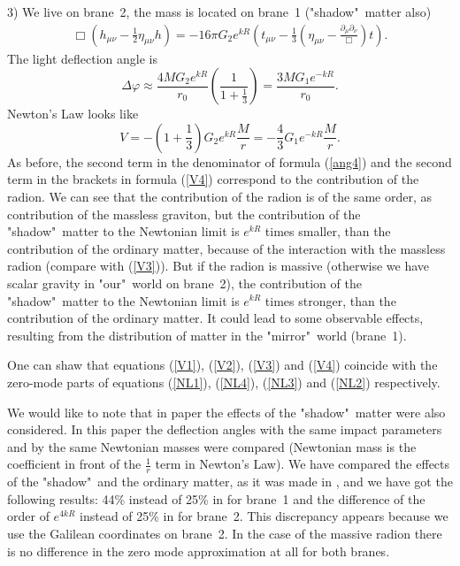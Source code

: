 \documentclass[a4paper,12pt]{article}
\begin{document}
3) We live on brane~2, the mass is located on brane~1 ("shadow"\
matter also)
\begin{eqnarray}
\Box \left(h_{\mu\nu}-\frac{1}{2}\eta_{\mu\nu}h\right)=-16\pi
G_{2}e^{kR}\left(t_{\mu\nu}-\frac{1}{3}\left(\eta_{\mu\nu}-\frac{
\partial_\mu\partial_\nu}{\Box}\right)t\right).
\end{eqnarray}
The light deflection angle is
\begin{equation}\label{ang4}
\Delta\varphi\approx\frac{4MG_{2}e^{kR}}{r_{0}}\left(\frac{1}{1+\frac{1}{3}}\right)
=\frac{3MG_{1}e^{-kR}}{r_{0}}.
\end{equation}
Newton's Law looks like
\begin{equation}\label{V4}
V=-\left(1+\frac{1}{3}\right)G_{2}e^{kR}\frac{M}{r}=-\frac{4}{3}G_{1}e^{-kR}\frac{M}{r}.
\end{equation}
As  before, the second term in the denominator of formula
(\ref{ang4}) and the second term in the brackets in formula
(\ref{V4}) correspond to the contribution of the  radion. We can
see that the contribution of the radion is of the same order, as
contribution of the massless graviton, but the contribution of the
"shadow"\ matter to  the Newtonian limit is $e^{kR}$ times
smaller, than the contribution of the ordinary matter, because of
the interaction with the massless radion (compare with
(\ref{V3})). But if the radion is massive (otherwise we have
scalar gravity in "our"\ world on brane~2), the contribution of
the "shadow"\ matter to the Newtonian limit is $e^{kR}$ times
stronger, than the contribution of the ordinary matter. It could
lead  to some observable effects, resulting from the  distribution
of matter in the "mirror"\ world (brane~1).

One can shaw that equations (\ref{V1}), (\ref{V2}), (\ref{V3}) and
(\ref{V4}) coincide with the zero-mode parts of equations (\ref{NL1}),
(\ref{NL4}), (\ref{NL3}) and (\ref{NL2}) respectively.

We would like to note that in paper \cite{GarTan} the effects of
the "shadow"\ matter were also considered. In this paper the
deflection angles with the same impact parameters and by the same
Newtonian masses were compared (Newtonian mass is the coefficient
in front of the $\frac{1}{r}$ term in Newton's Law). We have
compared the effects of the "shadow"\ and the ordinary matter, as
it was made in \cite{GarTan}, and we have got the following
results: 44\% instead of 25\% in \cite{GarTan} for brane~1 and the
difference of the order of $e^{4kR}$ instead of 25\% in
\cite{GarTan} for brane~2. This discrepancy appears because we use
the  Galilean coordinates on brane~2. In the case of the massive
radion there is no difference in the zero mode approximation at
all for both branes.
\end{document}
